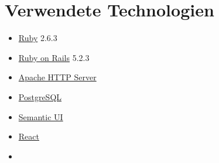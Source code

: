 \section{Verwendete Technologien}\label{sec:technologies}
\begin{itemize}
  \item \href{https://www.ruby-lang.org/en/}{Ruby} 2.6.3
  \item \href{https://rubyonrails.org/}{Ruby on Rails} 5.2.3
  \item \href{https://httpd.apache.org/}{Apache HTTP Server} 
  \item \href{https://www.postgresql.org/}{PostgreSQL} 
  \item \href{https://semantic-ui.com/}{Semantic UI} 
  \item \href{https://reactjs.org/}{React} 
  \item {}
\end{itemize}
